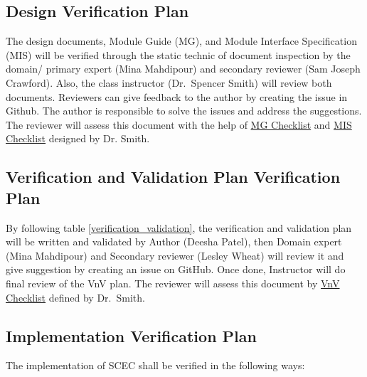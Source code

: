 \documentclass[12pt, titlepage]{article}
\begin{document}
\subsection{Design Verification Plan}
\label{design_verification_plan}

The design documents, Module Guide (MG), and Module Interface Specification (MIS) will be verified through the static technic of document inspection by the domain/ primary expert (Mina Mahdipour) and secondary reviewer (Sam Joseph Crawford). Also, the class instructor (Dr.\ Spencer Smith) will review both documents. Reviewers can give feedback to the author by creating the issue in Github. The author is responsible to solve the issues and address the suggestions. The reviewer will assess this document with the help of \href{https://github.com/smiths/capTemplate/blob/9251702fdcb9800c59f6ed3d11d91e2bd62fca6d/docs/Checklists/MG-Checklist.pdf}{MG Checklist} and \href{https://github.com/smiths/capTemplate/blob/9251702fdcb9800c59f6ed3d11d91e2bd62fca6d/docs/Checklists/MIS-Checklist.pdf}{MIS Checklist} designed by Dr. Smith. 

\subsection{Verification and Validation Plan Verification Plan}
\label{verification_validation_plan_verification_plan}

By following table \ref{verification_validation}, the verification and validation plan will be written and validated by Author (Deesha Patel), then Domain expert (Mina Mahdipour) and Secondary reviewer (Lesley Wheat) will review it and give suggestion by creating an issue on GitHub. Once done, Instructor will do final review of the VnV plan. The reviewer will assess this document by  \href{https://github.com/smiths/capTemplate/blob/9251702fdcb9800c59f6ed3d11d91e2bd62fca6d/docs/Checklists/VnV-Checklist.pdf}{VnV Checklist} defined by Dr.\ Smith.     

\subsection{Implementation Verification Plan}
\label{implementation_verification_plan}

The implementation of SCEC shall be verified in the following ways:
\end{document}
